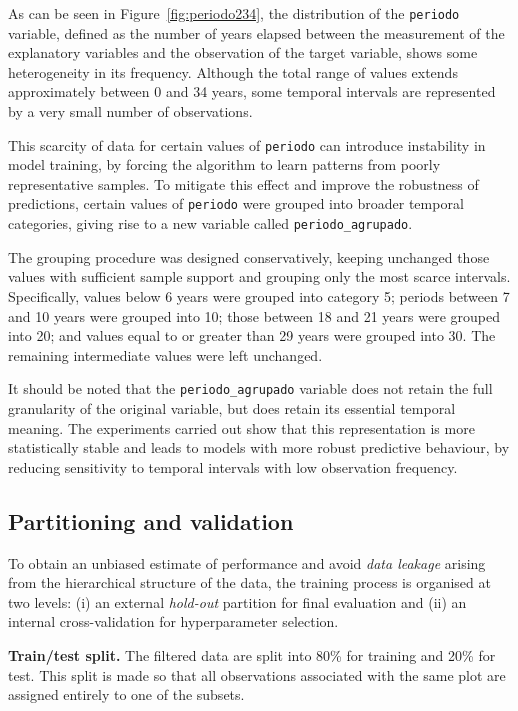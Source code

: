 As can be seen in Figure~\ref{fig:periodo234}, the distribution of the \texttt{periodo} variable, defined as the number of years elapsed between the measurement of the explanatory variables and the observation of the target variable, shows some heterogeneity in its frequency. Although the total range of values extends approximately between 0 and 34 years, some temporal intervals are represented by a very small number of observations.

This scarcity of data for certain values of \texttt{periodo} can introduce instability in model training, by forcing the algorithm to learn patterns from poorly representative samples. To mitigate this effect and improve the robustness of predictions, certain values of \texttt{periodo} were grouped into broader temporal categories, giving rise to a new variable called \texttt{periodo\_agrupado}.

The grouping procedure was designed conservatively, keeping unchanged those values with sufficient sample support and grouping only the most scarce intervals. Specifically, values below 6 years were grouped into category 5; periods between 7 and 10 years were grouped into 10; those between 18 and 21 years were grouped into 20; and values equal to or greater than 29 years were grouped into 30. The remaining intermediate values were left unchanged.

It should be noted that the \texttt{periodo\_agrupado} variable does not retain the full granularity of the original variable, but does retain its essential temporal meaning. The experiments carried out show that this representation is more statistically stable and leads to models with more robust predictive behaviour, by reducing sensitivity to temporal intervals with low observation frequency.

\subsection{Partitioning and validation}

To obtain an unbiased estimate of performance and avoid \emph{data leakage} arising from the hierarchical structure of the data, the training process is organised at two levels: (i) an external \emph{hold-out} partition for final evaluation and (ii) an internal cross-validation for hyperparameter selection.

\noindent\textbf{Train/test split.} The filtered data are split into 80\% for training and 20\% for test. This split is made so that all observations associated with the same plot are assigned entirely to one of the subsets.

